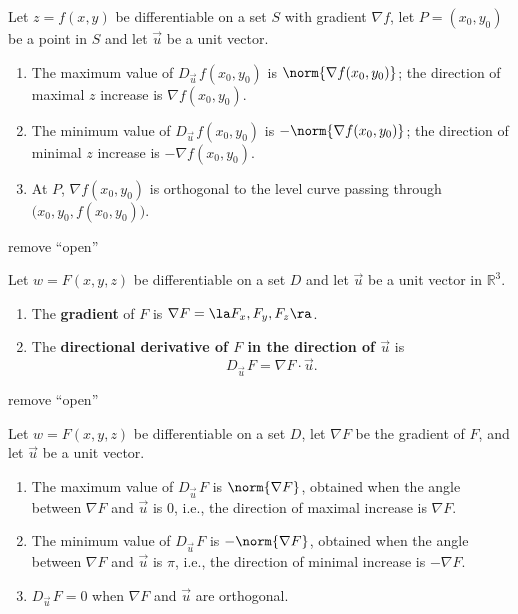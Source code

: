 \documentclass{article}
\begin{document}
{Let $z=f(x,y)$ be differentiable on a set $S$ with gradient $\nabla f$, let $P=(x_0,y_0)$ be a point in $S$ and let $\vec u$ be a unit vector.
\begin{enumerate}
	\item The maximum value of $D_{\vec u\,}f(x_0,y_0)$ is $\norm{\nabla f(x_0,y_0)}$; the direction of maximal $z$ increase is $\nabla f(x_0,y_0)$.
	\item   The minimum value of $D_{\vec u\,}f(x_0,y_0)$ is $-\norm{\nabla f(x_0,y_0)}$; the direction of minimal $z$ increase is $-\nabla f(x_0,y_0)$.
	\item At $P$, $\nabla f(x_0,y_0)$ is orthogonal to the level curve passing through $\big(x_0,y_0,f(x_0,y_0)\big)$.
\end{enumerate}
}

remove ``open''

{Let $w=F(x,y,z)$ be differentiable on a set $D$ and let $\vec u $ be a unit vector in $\mathbb{R}^3$.
\begin{enumerate}
	\item	The \textbf{gradient} of $F$ is $\nabla F = \la F_x,F_y,F_z\ra$.
	\item The \textbf{directional derivative of $F$ in the direction of $\vec u$} is $$D_{\vec u\,}F=\nabla F\cdot \vec u.$$
\end{enumerate}
}

remove ``open''

{Let $w=F(x,y,z)$ be differentiable on a set  $D$, let $\nabla F$ be the gradient of $F$, and let $\vec u$ be a unit vector.
\begin{enumerate}
	\item The maximum value of $D_{\vec u\,}F$ is $\norm{\nabla F}$, obtained when the angle between $\nabla F$ and $\vec u$ is 0, i.e.,  the direction of maximal increase is $\nabla F$.
	\item The minimum value of $D_{\vec u\,}F$ is $-\norm{\nabla F}$, obtained when the angle between $\nabla F$ and $\vec u$ is $\pi$, i.e., the direction of minimal increase is $-\nabla F$.
	\item $D_{\vec u\,}F = 0$ when $\nabla F$ and $\vec u$ are orthogonal.
\end{enumerate}
}
\end{document}
